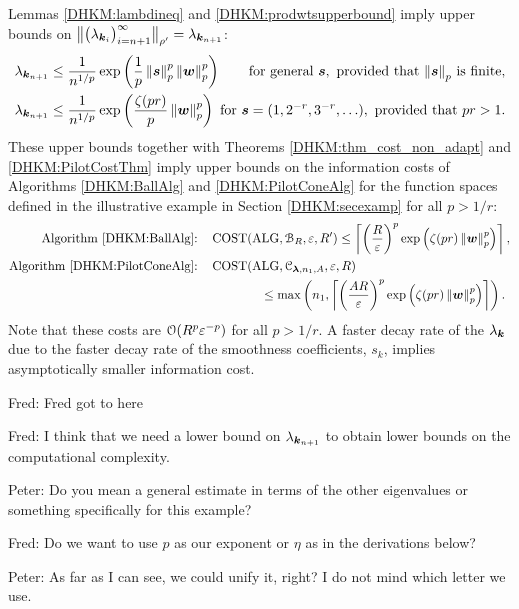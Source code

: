 \documentclass[USenglish]{article}
\theoremstyle{dgthm}
\theoremstyle{dgthm}
\theoremstyle{dgthm}
\theoremstyle{dgthm}
\theoremstyle{dgdef}
\theoremstyle{definition}
\DeclareMathOperator{\ALG}{ALG}
\DeclareMathOperator{\COST}{COST}
\newcommand{\norm}[2][{}]{\ensuremath{\left \lVert #2 \right \rVert}_{#1}}
\newcommand{\bignorm}[2][{}]{\ensuremath{\bigl \lVert #2 \bigr \rVert}_{#1}}
\newcommand{\FredNote}[1]{{\color{blue}Fred: #1}}
\newcommand{\PeterNote}[1]{{\color{orange}Peter: #1}}
\begin{document}
{Lemmas \ref{DHKM:lambdineq} and \ref{DHKM:prodwtsupperbound} imply upper bounds on $\bignorm[\rho']{\bigl(  \lambda_{\bsk_i}  \bigr)_{i = n+1}^{\infty}} = \lambda_{\bsk_{n+1}}$:
\begin{align*}
\lambda_{\bsk_{n+1}} &\le \frac{1}{n^{1/p}} \exp\left(\frac 1p \norm[p]{\bss}^p \norm[p]{\bsw}^p  \right) \qquad \text{for general } \bss, \text{ provided that  $\norm[p]{\bss}$ is finite},\\
\lambda_{\bsk_{n+1}} & \le \frac{1}{n^{1/p}} \exp\left(\frac {\zeta(pr)}p \norm[p]{\bsw}^p  \right) \  \text{for } \bss = (1, 2^{-r}, 3^{-r}, \ldots ), \text{ provided that } pr > 1.
\end{align*}
These upper bounds together with Theorems \ref{DHKM:thm_cost_non_adapt} and \ref{DHKM:PilotCostThm} imply upper bounds on the information costs of Algorithms \ref{DHKM:BallAlg} and \ref{DHKM:PilotConeAlg} for the function spaces defined in the illustrative example in Section \ref{DHKM:secexamp} for all $p > 1/r$:
\begin{align*}
    \text{Algorithm \ref{DHKM:BallAlg}:} \quad& \COST(\ALG,\calB_R,\varepsilon, R') 
    \le \left \lceil  \left(\frac{R}{\varepsilon}\right)^p  \exp\left( \zeta(pr) \norm[p]{\bsw}^p  \right)    \right \rceil, \\
    \text{Algorithm \ref{DHKM:PilotConeAlg}:} \quad& \COST(\ALG,\calC_{\bslambda,n_1,A},\varepsilon, R) 
    \\ & \qquad \qquad \le \max \left( n_1, 
    \left \lceil  \left(\frac{AR}{\varepsilon}\right)^p  \exp\left( \zeta(pr) \norm[p]{\bsw}^p  \right)    \right \rceil \right).
    \end{align*}
Note that these costs are ${\mathcal{O}}(R^p \varepsilon^{-p})$ for all $p > 1/r$. A faster decay rate of the $\lambda_{{\boldsymbol{k}}}$ due to the faster decay rate of the smoothness coefficients, $s_k$, implies asymptotically smaller information cost.
}

\FredNote{Fred got to here}

\FredNote{I think that we need a lower bound on $\lambda_{{\boldsymbol{k}}_{n+1}}$ to obtain lower bounds on the computational complexity. }

\PeterNote{Do you mean a general estimate in terms of the other eigenvalues 
or something specifically for this example?}

\FredNote{Do we want to use $p$ as our exponent or $\eta$ as in the derivations below?}

\PeterNote{As far as I can see, we could unify it, right? I do not mind which letter we use.}
\end{document}
